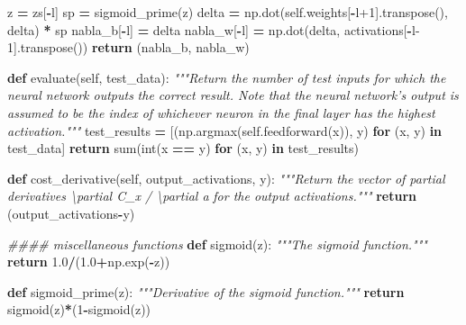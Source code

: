 \documentclass[]{book}
\newenvironment{Shaded}{\begin{snugshade}}{\end{snugshade}}
\newcommand{\KeywordTok}[1]{\textcolor[rgb]{0.13,0.29,0.53}{\textbf{{#1}}}}
\newcommand{\DecValTok}[1]{\textcolor[rgb]{0.00,0.00,0.81}{{#1}}}
\newcommand{\FloatTok}[1]{\textcolor[rgb]{0.00,0.00,0.81}{{#1}}}
\newcommand{\CommentTok}[1]{\textcolor[rgb]{0.56,0.35,0.01}{\textit{{#1}}}}
\newcommand{\VariableTok}[1]{\textcolor[rgb]{0.00,0.00,0.00}{{#1}}}
\newcommand{\ControlFlowTok}[1]{\textcolor[rgb]{0.13,0.29,0.53}{\textbf{{#1}}}}
\newcommand{\OperatorTok}[1]{\textcolor[rgb]{0.81,0.36,0.00}{\textbf{{#1}}}}
\newcommand{\BuiltInTok}[1]{{#1}}
\newcommand{\NormalTok}[1]{{#1}}
\begin{document}
\begin{Shaded}
\begin{Highlighting}[]
            \NormalTok{z }\OperatorTok{=} \NormalTok{zs[}\OperatorTok{-}\NormalTok{l]}
            \NormalTok{sp }\OperatorTok{=} \NormalTok{sigmoid_prime(z)}
            \NormalTok{delta }\OperatorTok{=} \NormalTok{np.dot(}\VariableTok{self}\NormalTok{.weights[}\OperatorTok{-}\NormalTok{l}\DecValTok{+1}\NormalTok{].transpose(), delta) }\OperatorTok{*} \NormalTok{sp}
            \NormalTok{nabla_b[}\OperatorTok{-}\NormalTok{l] }\OperatorTok{=} \NormalTok{delta}
            \NormalTok{nabla_w[}\OperatorTok{-}\NormalTok{l] }\OperatorTok{=} \NormalTok{np.dot(delta, activations[}\OperatorTok{-}\NormalTok{l}\DecValTok{-1}\NormalTok{].transpose())}
        \ControlFlowTok{return} \NormalTok{(nabla_b, nabla_w)}

    \KeywordTok{def} \NormalTok{evaluate(}\VariableTok{self}\NormalTok{, test_data):}
        \CommentTok{"""Return the number of test inputs for which the neural network outputs}
\CommentTok{        the correct result.  Note that the neural network's output is assumed to}
\CommentTok{        be the index of whichever neuron in the final layer has the highest }
\CommentTok{        activation."""}
        \NormalTok{test_results }\OperatorTok{=} \NormalTok{[(np.argmax(}\VariableTok{self}\NormalTok{.feedforward(x)), y)}
                        \ControlFlowTok{for} \NormalTok{(x, y) }\OperatorTok{in} \NormalTok{test_data]}
        \ControlFlowTok{return} \BuiltInTok{sum}\NormalTok{(}\BuiltInTok{int}\NormalTok{(x }\OperatorTok{==} \NormalTok{y) }\ControlFlowTok{for} \NormalTok{(x, y) }\OperatorTok{in} \NormalTok{test_results)}

    \KeywordTok{def} \NormalTok{cost_derivative(}\VariableTok{self}\NormalTok{, output_activations, y):}
        \CommentTok{"""Return the vector of partial derivatives \textbackslash{}partial C_x / \textbackslash{}partial a }
\CommentTok{        for the output activations."""}
        \ControlFlowTok{return} \NormalTok{(output_activations}\OperatorTok{-}\NormalTok{y)}

\CommentTok{#### miscellaneous functions}
\KeywordTok{def} \NormalTok{sigmoid(z):}
    \CommentTok{"""The sigmoid function."""}
    \ControlFlowTok{return} \FloatTok{1.0}\OperatorTok{/}\NormalTok{(}\FloatTok{1.0}\OperatorTok{+}\NormalTok{np.exp(}\OperatorTok{-}\NormalTok{z))}

\KeywordTok{def} \NormalTok{sigmoid_prime(z):}
    \CommentTok{"""Derivative of the sigmoid function."""}
    \ControlFlowTok{return} \NormalTok{sigmoid(z)}\OperatorTok{*}\NormalTok{(}\DecValTok{1}\OperatorTok{-}\NormalTok{sigmoid(z))}
\end{Highlighting}
\end{Shaded}
\end{document}
